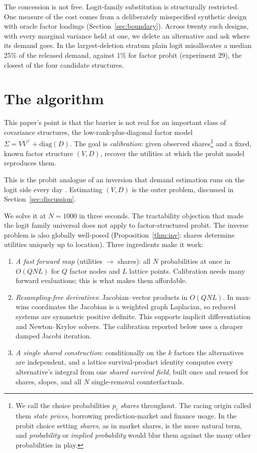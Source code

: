 \documentclass[12pt]{article}
\theoremstyle{remark}
\begin{document}
The concession is not free. Logit-family substitution is structurally
restricted. One measure of the cost comes from a deliberately misspecified
synthetic design with oracle factor loadings
(Section~\ref{sec:boundary}). Across twenty such designs, with every
marginal variance held at one, we delete an alternative and ask where
its demand goes. In the largest-deletion stratum plain logit
misallocates a median 25\% of the released demand, against 1\% for
factor probit (experiment 29), the closest of the four candidate
structures.

\section{The algorithm}\label{sec:algorithm}

This paper's point is that the barrier is not real for an important
class of covariance structures, the low-rank-plus-diagonal factor model
$\Sigma = VV^\top + \mathrm{diag}(D)$. The goal is \emph{calibration}: given
observed shares\footnote{We call the choice probabilities $p_i$ \emph{shares} throughout. The racing origin \citep{cotton2021} called them \emph{state prices}, borrowing prediction-market and finance usage. In the probit choice setting \emph{shares}, as in market shares, is the more natural term, and \emph{probability} or \emph{implied probability} would blur them against the many other probabilities in play.} and a fixed, known factor structure $(V, D)$, recover the
utilities at which the probit model reproduces them.

This is the probit
analogue of an inversion that demand estimation runs on the logit side
every day \citep{berry1995,conlon2020}. Estimating $(V, D)$ is the outer problem,
discussed in Section~\ref{sec:discussion}.

We solve it at $N = 1000$
in three seconds. The tractability objection that made the logit family
universal does not apply to factor-structured probit. The inverse
problem is also globally well-posed
(Proposition~\ref{thm:inv}: shares determine utilities uniquely up to
location). Three ingredients make it work:

\begin{enumerate}
\item \emph{A fast forward map} (utilities $\to$ shares): all $N$
probabilities at once in $O(QNL)$ for $Q$ factor nodes and $L$ lattice
points. Calibration needs many forward evaluations; this is what makes
them affordable.
\item \emph{Resampling-free derivatives}: Jacobian--vector products in
$O(QNL)$. In max-wins coordinates the Jacobian is a weighted graph
Laplacian, so reduced systems are symmetric positive definite. This supports
implicit differentiation and Newton--Krylov solvers. The calibration
reported below uses a cheaper damped Jacobi iteration.
\item \emph{A single shared construction}: conditionally on the $k$
factors the alternatives are independent, and a lattice survival-product
identity computes every alternative's integral from one \emph{shared
survival field}, built once and reused for shares, slopes, and all $N$
single-removal counterfactuals.
\end{enumerate}
\end{document}
